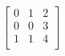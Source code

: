 \documentclass{article}
\begin{document}
 $
\left[
\begin{array}{c|c|c}
0 & 1 & 2 \\
0 & 0 & 3 \\
1 & 1 & 4 \\
\end{array}
\right] $
\end{document}

